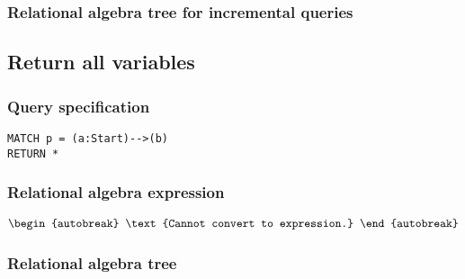 \subsubsection*{Relational algebra tree for incremental queries}


\subsection{Return all variables}

\subsubsection*{Query specification}

\begin{lstlisting}
MATCH p = (a:Start)-->(b)
RETURN *
\end{lstlisting}

\subsubsection*{Relational algebra expression}

\begin{align*}
\begin{autobreak}
\text{Cannot convert to expression.}
\end{autobreak}
\end{align*}

\subsubsection*{Relational algebra tree}


